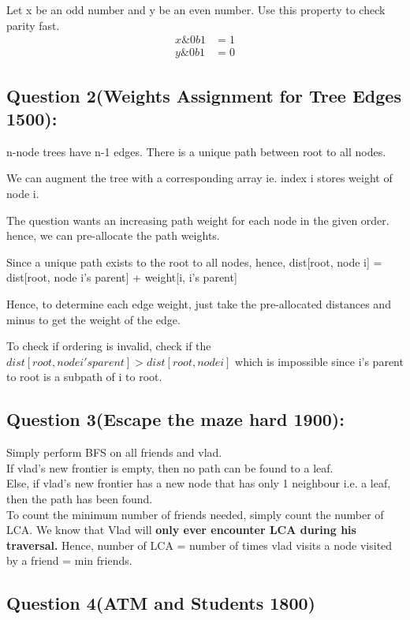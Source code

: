 \documentclass[12pt]{article}
\begin{document}
{ Let x be an odd number and y be an even number.  Use this property to check parity fast. 
 \begin{align}
  x \& 0b1 & = 1 \\ 
  y \& 0b1 & = 0 
 \end{align} 
 
 \subsection{Question 2(Weights Assignment for Tree Edges 1500):} 
 
 n-node trees have n-1 edges. 
 There is a unique path between root to all nodes. 
 
 We can augment the tree with a corresponding array ie. index i stores weight of node i. 
 
 The question wants an increasing path weight for each node in the given order. 
 hence, we can pre-allocate the path weights. 
 
 Since a unique path exists to the root to all nodes, hence, 
 dist[root, node i] = dist[root, node i's parent] + weight[i, i's parent] 
 
 Hence, to determine each edge weight, just take the pre-allocated distances and minus to get the weight of the edge. 
 
 To check if ordering is invalid, check if the \(dist[root, node i's parent] > dist[root, node i]\) which is impossible since i's parent to root is a subpath of i to root. 
 
 \subsection{Question 3(Escape the maze hard 1900):}
 
 Simply perform BFS on all friends and vlad. \\
 If vlad's new frontier is empty, then no path can be found to a leaf. \\
 Else, if vlad's new frontier has a new node that has only 1 neighbour i.e. a leaf, then the path has been found. \\ 
 
 To count the minimum number of friends needed, simply count the number of LCA. 
 We know that Vlad will {\textbf{only ever encounter LCA during his traversal.}}
 Hence, number of LCA = number of times vlad visits a node visited by a friend = min friends.
 
 \subsection{Question 4(ATM and Students 1800)} 
 
}
\end{document}
